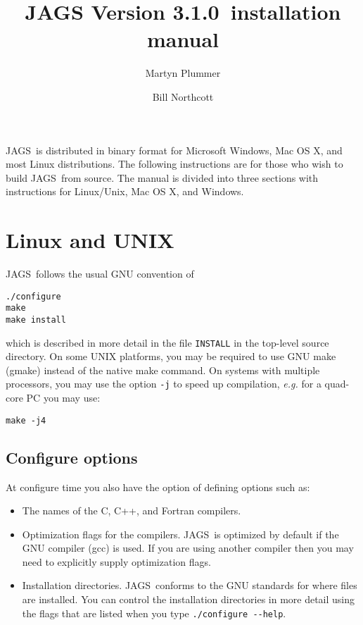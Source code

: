 \documentclass[11pt, a4paper, titlepage]{article}
\newcommand{\release}{3.1.0}
\newcommand{\JAGS}{\textsf{JAGS}}
\begin{document}
\title{JAGS Version \release\ installation manual}
\author{Martyn Plummer \and Bill Northcott}
\maketitle

\JAGS\ is distributed in binary format for Microsoft Windows, Mac OS
X, and most Linux distributions.  The following instructions are for
those who wish to build \JAGS\ from source. The manual is divided
into three sections with instructions for Linux/Unix, Mac OS X, and Windows.

\section{Linux and UNIX}

\JAGS\ follows the usual GNU convention of 
\begin{verbatim}
./configure
make
make install
\end{verbatim}
which is described in more detail in the file \texttt{INSTALL} in
the top-level source directory. On some UNIX platforms, you may
be required to use GNU make (gmake) instead of the native make
command. On systems with multiple processors, you may use the option 
\verb+-j+ to speed up compilation, {\em e.g.} for a quad-core PC you
may use:
\begin{verbatim}
make -j4
\end{verbatim}

\subsection{Configure options}

At configure time you also have the option of defining options such
as:
\begin{itemize}
\item The names of the C, C++, and Fortran compilers.  
\item Optimization flags for the compilers.  \JAGS\ is optimized by
  default if the GNU compiler (gcc) is used. If you are using another
  compiler then you may need to explicitly supply optimization flags.
\item Installation directories. \JAGS\ conforms to the GNU standards
  for where files are installed. You can control the installation
  directories in more detail using the flags that are listed when
  you type \verb+./configure --help+.
\end{itemize}
\end{document}
